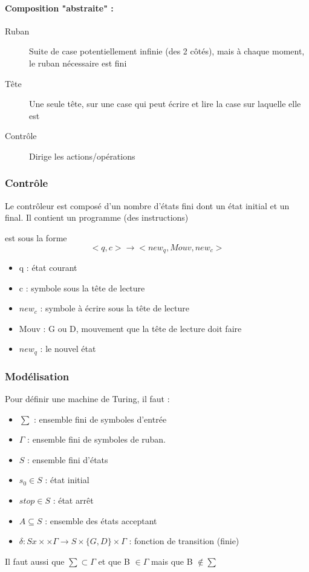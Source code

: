 \paragraph{Composition "abstraite" :}
\begin{description}
	\item[Ruban] Suite de case potentiellement infinie (des 2 côtés), mais à 
		chaque moment, le ruban nécessaire est fini
	\item[Tête] Une seule tête, sur une case qui peut écrire et lire la 
		case sur laquelle elle est
	\item[Contrôle] Dirige les actions/opérations
\end{description}

\subsubsection{Contrôle}
\label{ssub:contr_le}
Le contrôleur est composé d'un nombre d'états fini dont un état initial et un 
final. Il contient un programme (des instructions)

\begin{mydef} est sous la forme 
	$$<q,c> \rightarrow <new_q, Mouv, new_c>$$
	\begin{itemize}
		\item q : état courant
		\item c : symbole sous la tête de lecture
		\item $new_c$ : symbole à écrire sous la tête de lecture
		\item Mouv : G ou D, mouvement que la tête de lecture doit faire
		\item $new_q$ : le nouvel état
	\end{itemize}
\end{mydef}


\subsubsection{Modélisation}
Pour définir une machine de Turing, il faut :
\begin{itemize}
	\item $\sum$ : ensemble fini de symboles d'entrée
	\item $\Gamma$ : ensemble fini de symboles de ruban.
	\item $S$ : ensemble fini d'états
	\item $s_0 \in S$ : état initial
	\item $stop \in S$ : état arrêt
	\item $A \subseteq S$ : ensemble des états acceptant
	\item $\delta : Sx\times \times \Gamma \rightarrow S \times \{G,D\} 
	\times \Gamma$ : fonction de transition (finie)
\end{itemize}
Il faut aussi que $\sum \subset \Gamma$ et que B $\in \Gamma$ mais que B 
$\notin \sum$

